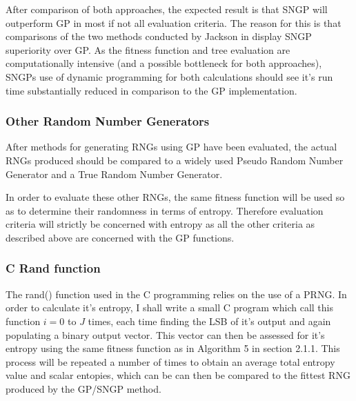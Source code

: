 \documentclass[a4paper,10.5pt]{article}
\begin{document}
After comparison of both approaches, the expected result is that SNGP will outperform GP in most if not all evaluation criteria. The reason for this is that comparisons of the two methods conducted by Jackson in \cite[p.55]{jacksonsngp} display SNGP superiority over GP. As the fitness function and tree evaluation are computationally intensive (and a possible bottleneck for both approaches), SNGPs use of dynamic programming for both calculations should see it's run time substantially reduced in comparison to the GP implementation.


\subsubsection{Other Random Number Generators}
After methods for generating RNGs using GP have been evaluated, the actual RNGs produced should be compared to a widely used Pseudo Random Number Generator and a True Random Number Generator.

In order to evaluate these other RNGs, the same fitness function will be used so as to determine their randomness in terms of entropy. Therefore evaluation criteria will strictly be concerned with entropy as all the other criteria as described above are concerned with the GP functions.

\subsubsection{C Rand function}
The rand() function used in the C programming relies on the use of a PRNG. In order to calculate it's entropy, I shall write a small C program which call this function $i = 0$ to $J$ times, each time finding the LSB of it's output and again populating a binary output vector. This vector can then be assessed for it's entropy using the same fitness function as in Algorithm 5 in section 2.1.1. This process will be repeated a number of times to obtain an average total entropy value and scalar entopies, which can be can then be compared to the fittest RNG produced by the GP/SNGP method.
\end{document}

